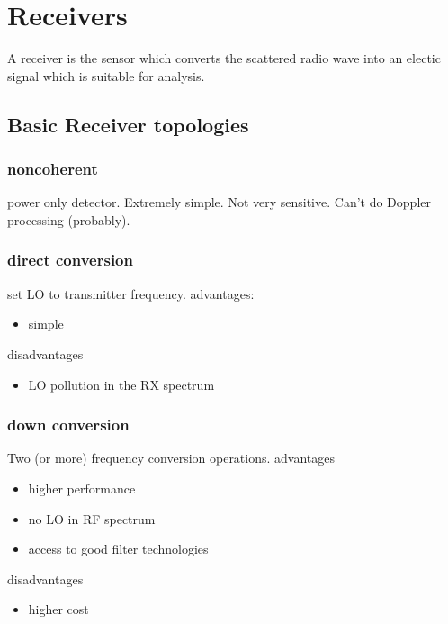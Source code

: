 
\chapter{Receivers}

A receiver is the sensor which converts the scattered radio wave into
an electic signal which is suitable for analysis.

\section{Basic Receiver topologies}

\subsection{noncoherent}

power only detector.  Extremely simple.  Not very sensitive.  Can't do
Doppler processing (probably).

\subsection{direct conversion}

set LO to transmitter frequency.
advantages:
\begin{itemize}
\item simple
\end{itemize}

disadvantages
\begin{itemize}
\item LO pollution in the RX spectrum
\end{itemize}

\subsection{down conversion}

Two (or more) frequency conversion operations.
advantages
\begin{itemize}
\item higher performance
\item no LO in RF spectrum
\item access to good filter technologies
\end{itemize}

disadvantages
\begin{itemize}
\item higher cost
\end{itemize}


